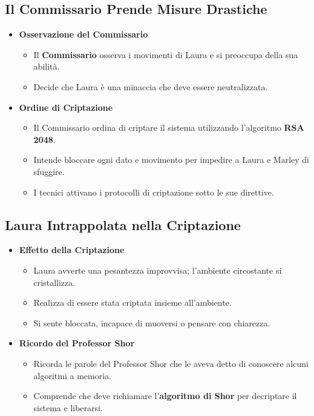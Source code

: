 \subsection*{Il Commissario Prende Misure Drastiche}

\begin{itemize}
    \item \textbf{Osservazione del Commissario}
    \begin{itemize}
        \item Il \textbf{Commissario} osserva i movimenti di Laura e si preoccupa della sua abilità.
        \item Decide che Laura è una minaccia che deve essere neutralizzata.
    \end{itemize}
    \item \textbf{Ordine di Criptazione}
    \begin{itemize}
        \item Il Commissario ordina di criptare il sistema utilizzando l'algoritmo \textbf{RSA 2048}.
        \item Intende bloccare ogni dato e movimento per impedire a Laura e Marley di sfuggire.
        \item I tecnici attivano i protocolli di criptazione sotto le sue direttive.
    \end{itemize}
\end{itemize}

\subsection*{Laura Intrappolata nella Criptazione}

\begin{itemize}
    \item \textbf{Effetto della Criptazione}
    \begin{itemize}
        \item Laura avverte una pesantezza improvvisa; l'ambiente circostante si cristallizza.
        \item Realizza di essere stata criptata insieme all'ambiente.
        \item Si sente bloccata, incapace di muoversi o pensare con chiarezza.
    \end{itemize}
    \item \textbf{Ricordo del Professor Shor}
    \begin{itemize}
        \item Ricorda le parole del Professor Shor che le aveva detto di conoscere alcuni algoritmi a memoria.
        \item Comprende che deve richiamare l'\textbf{algoritmo di Shor} per decriptare il sistema e liberarsi.
    \end{itemize}
\end{itemize}


